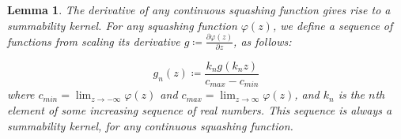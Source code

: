 \documentclass{article} %
\newtheorem{lem}[thm]{Lemma}
\begin{document}
\begin{lem}\label{lem:squashderivissum}
	The derivative of any continuous squashing function gives rise to a summability kernel.
	For any squashing function $\varphi(z)$,
	we define a sequence of functions from scaling its derivative 
    $g \coloneqq \frac{\partial\varphi(z)}{\partial z}$, as follows:
    
    
	\begin{equation}
	g_n(z) \coloneqq \frac{k_n g(k_n z)}{ c_{max} - c_{min}} 
	\end{equation}
	 where $c_{min}=\lim_{z \to -\infty} \varphi(z)$ and $c_{max}=\lim_{z \to \infty} \varphi(z)$,
	 and $k_n$ is the $n$th element of some increasing sequence of real numbers.
	This sequence is always a summability kernel, for any continuous squashing function.
	

\end{lem}
\end{document}
